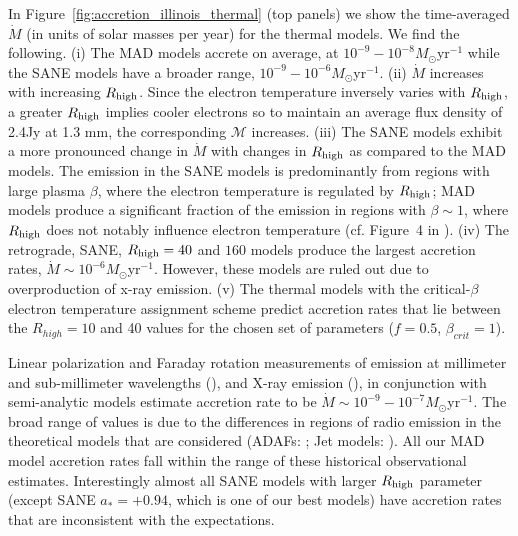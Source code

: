 In Figure~\ref{fig:accretion_illinois_thermal} (top panels) we show the time-averaged $\dot{M}$ (in units of solar masses per year) for the \kharma thermal models. We find the following. (i) The MAD models accrete on average, at $10^{-9}-10^{-8} M_{\odot}$yr$^{-1}$ while the SANE models have a broader range, $10^{-9}-10^{-6} M_{\odot}$yr$^{-1}$. (ii) $\dot{M}$ increases with increasing $R_\mathrm{high}$. Since the electron temperature inversely varies with $R_\mathrm{high}$, a greater $R_\mathrm{high}$ implies cooler electrons so to maintain an average flux density of 2.4Jy at 1.3 mm, the corresponding $\mathcal{M}$ increases. (iii) The SANE models exhibit a more pronounced change in $\dot{M}$ with changes in $R_\mathrm{high}$ as compared to the MAD models. The emission in the SANE models is predominantly from regions with large plasma $\beta$, where the electron temperature is regulated by $R_\mathrm{high}$; MAD models produce a significant fraction of the emission in regions with $\beta\sim 1$, where $R_\mathrm{high}$ does not notably influence electron temperature (cf. Figure~4 in ). (iv) The retrograde, SANE, $R_\mathrm{high}=40$ and $160$ models produce the largest accretion rates, $\dot{M}\sim 10^{-6}M_{\odot}$yr$^{-1}$. However, these models are ruled out due to overproduction of x-ray emission. (v) The thermal models with the critical-$\beta$ electron temperature assignment scheme predict accretion rates that lie between the $R_{high}=10$ and 40 values for the chosen set of parameters ($f=0.5$, $\beta_{crit}=1$).
\color{red}{\bf please add if bhac confirms this general trends. add figure but it would be best to plot this all together using maybe more transparent lines for bhac sims in the existing figure.}
\color{black}

Linear polarization and Faraday rotation measurements of \sgra emission at millimeter and sub-millimeter wavelengths (\citealt{2000ApJ...538L.121A, 2000ApJ...545..842Q, 2003ApJ...588..331B, 2006ApJ...640..308M, 2006JPhCS..54..354M, 2006ApJ...646L.111M}), and X-ray emission (\citealt{2003ApJ...591..891B, doi:10.1126/science.1240755}), in conjunction with semi-analytic models estimate \sgra accretion rate to be $\dot{M} \sim 10^{-9} - 10^{-7} M_{\odot}$yr$^{-1}$. The broad range of values is due to the differences in regions of radio emission in the theoretical models that are considered (ADAFs: \citealt{1998ApJ...492..554N, Yuan_2003}; Jet models: \citealt{1993A&A...278L...1F, 2000A&A...362..113F}). All our MAD model accretion rates  fall within the range of these historical observational estimates. Interestingly almost all SANE models with larger $R_\mathrm{high}$ parameter (except SANE $a_*=+0.94$, which is one of our best models) have accretion rates that are inconsistent with the expectations. 


